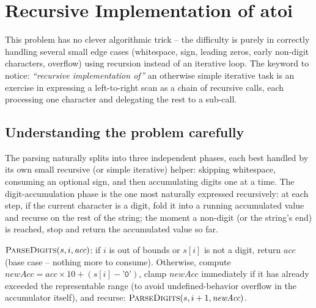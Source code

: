 \section{Recursive Implementation of atoi}
\label{sec:rec-atoi}


\begin{patternbox}
This problem has no clever algorithmic trick -- the difficulty is purely
in correctly handling several small edge cases (whitespace, sign,
leading zeros, early non-digit characters, overflow) using recursion
instead of an iterative loop. The keyword to notice: \emph{``recursive
implementation of''} an otherwise simple iterative task is an exercise in
expressing a left-to-right scan as a chain of recursive calls, each
processing one character and delegating the rest to a sub-call.
\end{patternbox}

\subsection*{Understanding the problem carefully}

The parsing naturally splits into three independent phases, each best
handled by its own small recursive (or simple iterative) helper: skipping
whitespace, consuming an optional sign, and then accumulating digits one
at a time. The digit-accumulation phase is the one most naturally
expressed recursively: at each step, if the current character is a
digit, fold it into a running accumulated value and recurse on the rest
of the string; the moment a non-digit (or the string's end) is reached,
stop and return the accumulated value so far.

\begin{ideabox}
$\textsc{ParseDigits}(s, i, \textit{acc})$: if $i$ is out of bounds or
$s[i]$ is not a digit, return $\textit{acc}$ (base case -- nothing more
to consume). Otherwise, compute $\textit{newAcc} = \textit{acc} \times 10
+ (s[i] - \texttt{'0'})$, clamp $\textit{newAcc}$ immediately if it has
already exceeded the representable range (to avoid undefined-behavior
overflow in the accumulator itself), and recurse:
$\textsc{ParseDigits}(s, i+1, \textit{newAcc})$.
\end{ideabox}

